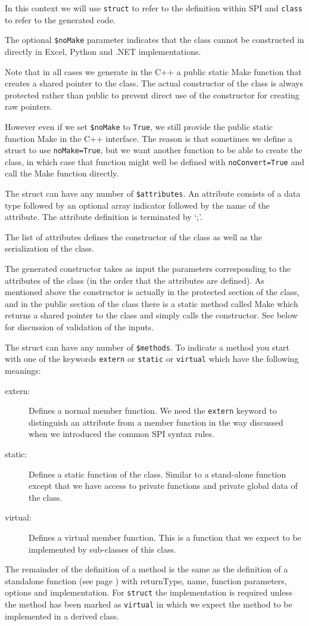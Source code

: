 In this context we will use \texttt{struct} to refer to the definition within SPI and \texttt{class} to refer to the generated code.

The optional \texttt{\$noMake} parameter indicates that the class cannot be constructed in directly in Excel, Python and .NET implementations.

Note that in all cases we generate in the C++ a public static Make function that creates a shared pointer to the class.
The actual constructor of the class is always protected rather than public to prevent direct use of the constructor for creating raw pointers.

However even if we set \texttt{\$noMake} to \texttt{True}, we still provide the public static function Make in the C++ interface.
The reason is that sometimes we define a struct to use \texttt{noMake=True}, but we want another function to be able to create the class, in which case that function might well be defined with \texttt{noConvert=True} and call the Make function directly.

The struct can have any number of \texttt{\$attributes}.
An attribute consists of a data type followed by an optional array indicator followed by the name of the attribute.
The attribute definition is terminated by `;'.

The list of attributes defines the constructor of the class as well as the serialization of the class.

The generated constructor takes as input the parameters corresponding to the attributes of the class (in the order that the attributes are defined).
As mentioned above the constructor is actually in the protected section of the class, and in the public section of the class there is a static method called Make which returns a shared pointer to the class and simply calls the constructor.
See below for discussion of validation of the inputs.

The struct can have any number of \texttt{\$methods}.
To indicate a method you start with one of the keywords \texttt{extern} or \texttt{static} or \texttt{virtual} which have the following meanings:
\begin{description}
\item[extern:] Defines a normal member function.
We need the \texttt{extern} keyword to distinguish an attribute from a member function in the way discussed when we introduced the common SPI syntax rules.
\item[static:] Defines a static function of the class.
Similar to a stand-alone function except that we have access
to private functions and private global data of the class.
\item[virtual:] Defines a virtual member function.
This is a function that we expect to be implemented by 
sub-classes of this class.
\end{description}
The remainder of the definition of a method is the same as the definition of a standalone function (see page \pageref{extern}) with returnType, name, function parameters, options and implementation.
For \texttt{struct} the implementation is required unless the method has been marked as \texttt{virtual} in which we expect the method to be implemented in a derived class.

